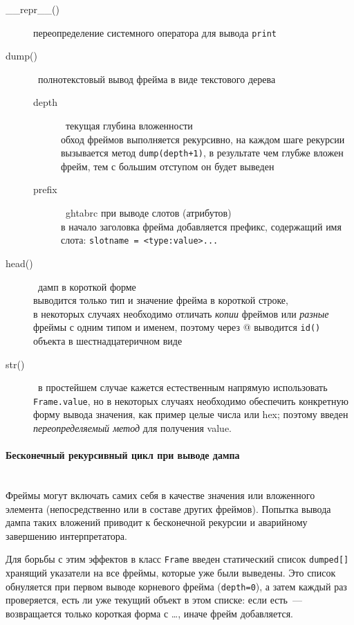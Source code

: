 \begin{description}
\item[\_\_repr\_\_()] переопределение системного оператора для вывода
\verb|print|
\item[dump()]\ полнотекстовый вывод фрейма в виде текстового дерева
\begin{description}
\item[depth]\ текущая глубина вложенности\\
обход фреймов выполняется рекурсивно, на каждом шаге рекурсии вызывается метод
\verb|dump(depth+1)|, в результате чем глубже вложен фрейм, тем с большим
отступом он будет выведен
\item[prefix]\ ghtabrc при выводе слотов (атрибутов)\\
в начало заголовка фрейма добавляется префикс, содержащий имя слота:
\verb|slotname = <type:value>...|
\end{description}
\end{description}

\smallskip
{}
 \begin{description}
\item[head()]\ дамп в короткой форме\\
выводится только тип и значение фрейма в короткой строке,\\
в некоторых случаях необходимо отличать \textit{копии} фреймов или
\textit{разные} фреймы с одним типом и именем, поэтому через @ выводится
\verb|id()| объекта в шестнадцатеричном виде
\end{description}


\begin{description}
\item[str()]\ в простейшем случае кажется естественным напрямую
использовать \verb|Frame.value|, но в некоторых случаях необходимо обеспечить
конкретную форму вывода значения, как пример целые числа или hex; поэтому
введен \emph{переопределяемый метод} для получения value.
\end{description}

\paragraph{Бесконечный рекурсивный цикл при выводе дампа}\ \\

Фреймы могут включать самих себя в качестве значения или вложенного элемента
(непосредственно или в составе других фреймов). Попытка вывода дампа таких
вложений приводит к бесконечной рекурсии и аварийному завершению интерпретатора.

Для борьбы с этим эффектов в класс \verb|Frame| введен статический список
\verb|dumped[]| хранящий указатели на все фреймы, которые уже были выведены.
Это список обнуляется при первом выводе корневого фрейма (\verb|depth=0|), а
затем каждый раз проверяется, есть ли уже текущий объект в этом списке: если
есть\ --- возвращается только короткая форма с \ldots, иначе фрейм добавляется.

\clearpage
{}

\secup
